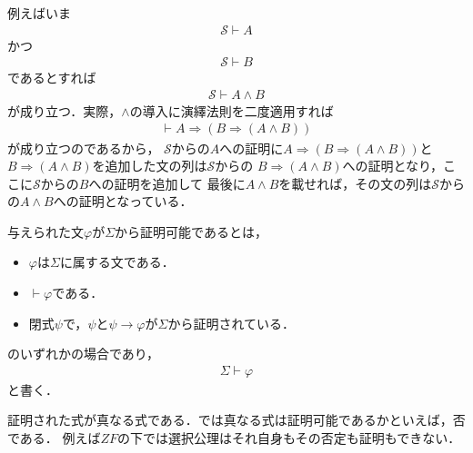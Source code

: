 	例えばいま
	\begin{align}
		\mathscr{S} \vdash A
	\end{align}
	かつ
	\begin{align}
		\mathscr{S} \vdash B
	\end{align}
	であるとすれば
	\begin{align}
		\mathscr{S} \vdash A \wedge B
	\end{align}
	が成り立つ．実際，$\wedge$の導入に演繹法則を二度適用すれば
	\begin{align}
		\vdash A \Longrightarrow (B \Longrightarrow (A \wedge B))
	\end{align}
	が成り立つのであるから，
	$\mathscr{S}$からの$A$への証明に$A \Longrightarrow (B \Longrightarrow (A \wedge B))$と
	$B \Longrightarrow (A \wedge B)$を追加した文の列は$\mathscr{S}$からの
	$B \Longrightarrow (A \wedge B)$への証明となり，ここに$\mathscr{S}$からの$B$への証明を追加して
	最後に$A \wedge B$を載せれば，その文の列は$\mathscr{S}$からの$A \wedge B$への証明となっている．
	
	与えられた文$\varphi$が$\Sigma$から証明可能であるとは，
	\begin{itemize}
		\item $\varphi$は$\Sigma$に属する文である．
		\item $\vdash \varphi$である．
		\item 閉式$\psi$で，$\psi$と$\psi \rightarrow \varphi$が$\Sigma$から証明されている．
	\end{itemize}
	
	のいずれかの場合であり，
	\begin{align}
		\Sigma \vdash \varphi
	\end{align}
	と書く．
	
	証明された式が真なる式である．では真なる式は証明可能であるかといえば，否である．
	例えば$ZF$の下では選択公理はそれ自身もその否定も証明もできない．